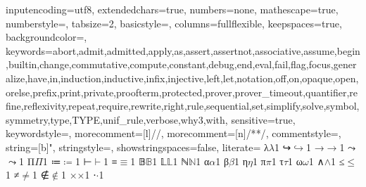 
{
inputencoding=utf8,
extendedchars=true,
numbers=none,
mathescape=true,
numberstyle={},
tabsize=2,
basicstyle={\ttfamily\small},
columns=fullflexible,
keepspaces=true,
backgroundcolor=\color{lightgrey},
keywords={abort,admit,admitted,apply,as,assert,assertnot,associative,assume,begin,builtin,change,commutative,compute,constant,debug,end,eval,fail,flag,focus,generalize,have,in,induction,inductive,infix,injective,left,let,notation,off,on,opaque,open,orelse,prefix,print,private,proofterm,protected,prover,prover_timeout,quantifier,refine,reflexivity,repeat,require,rewrite,right,rule,sequential,set,simplify,solve,symbol,symmetry,type,TYPE,unif_rule,verbose,why3,with},
sensitive=true,
keywordstyle=\color{blue},
morecomment=[l]{//},
morecomment=[n]{/*}{*/},
commentstyle={\itshape\color{red}},
string=[b]{"},
stringstyle=\color{orange},
showstringspaces=false,
literate=
	{λ}{$\lambda$}1
{↪}{$\hookrightarrow$}1
{→}{$\rightarrow$}1
{⤳}{$\rightcurvedarrow$}1
{Π}{$\Pi$}1
{≔}{$\coloneqq$}1
{⊢}{$\vdash$}1
{≡}{$\equiv$}1
{𝔹}{$\mathbb{B}$}1
{𝕃}{$\mathbb{L}$}1
{ℕ}{$\mathbb{N}$}1
{α}{$\alpha$}1
{β}{$\beta$}1
{η}{$\eta$}1
{π}{$\pi$}1
{τ}{$\tau$}1
{ω}{$\omega$}1
{∧}{$\wedge$}1
{≤}{$\le$}1
{≠}{$\neq$}1
{∉}{$\notin$}1
{×}{$\times$}1
{⋅}{$\cdot$}1
}
